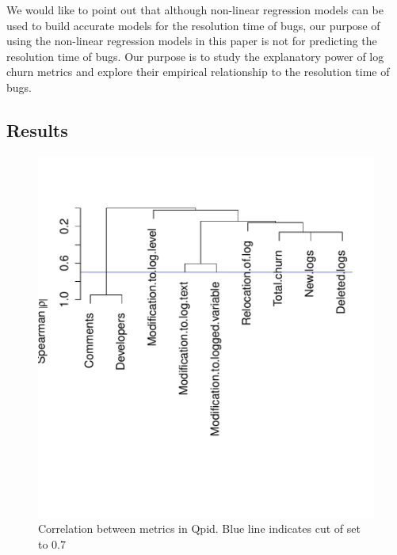 We would like to point out that although non-linear regression models can be used to build accurate models for the resolution time of bugs, our purpose of using the non-linear regression models in this paper is not for predicting the resolution time of bugs. Our purpose is to study the explanatory power of log churn metrics and explore their empirical relationship to the resolution time of bugs.%



\subsection*{Results}

\begin{figure}[t]
	\centering 
	\begin{minipage}[b]{1\columnwidth}
			\centering 
			\includegraphics[width=.8\columnwidth]{QpidSpearman}	

	\end{minipage}
	
	\vspace*{-1.5cm}	\caption{Correlation between metrics in Qpid. Blue line indicates cut of set to 0.7\label{fig:Correlation}}
\end{figure}


